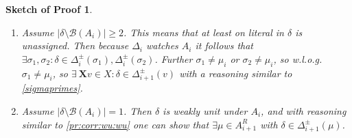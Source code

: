 \documentclass{vutinfth} %
\newtheorem{proof-sketch}{Sketch of Proof}[chapter]
\newcommand{\bass}{\mathcal{B}}
\newcommand{\ass}{A}
\newcommand{\bX}{\mathbf{X}}
\newcommand{\dpm}{\Delta^\pm}
\newcommand{\sgl}{\mu}
\newcommand{\bsgl}{\sigma}
\begin{document}
\begin{proof-sketch}
\begin{enumerate}
\begin{enumerate}
\begin{enumerate}
\item Assume $|\delta \setminus \bass(\ass_i)| \geq 2$. This means that at least on literal in $\delta$ is unassigned. Then because $\Delta_i$ watches $A_i$ it follows that $\exists \bsgl_1, \bsgl_2 : \delta \in \Delta_i^\pm(\bsgl_1), \Delta_i^\pm(\bsgl_2)$. Further $\bsgl_1 \not = \sgl_i$ or $\bsgl_2 \not = \sgl_i$, so w.l.o.g.~$\bsgl_1 \not = \sgl_i$, so $\exists \ {\bX v} \in X : \delta \in \Delta_{i+1}^\pm(v)$ with a reasoning similar to \ref{sigmaprimes}.

\item Assume $|\delta \setminus \bass(\ass_i)| = 1$. Then $\delta$ is weakly unit under $A_i$, and with reasoning similar to \ref{pr:corr:wu:wu} one can show that $\exists \sgl \in \ass^R_{i+1}$ with $\delta \in \dpm_{i+1}(\sgl)$.
\end{enumerate}

\end{enumerate}

\end{enumerate}


\end{proof-sketch}
\end{document}
